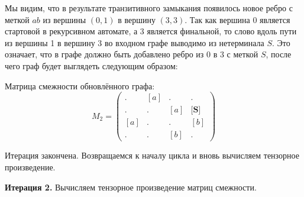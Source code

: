 \begin{example}
Мы видим, что в результате транзитивного замыкания появилось новое ребро с меткой $ab$ из вершины $(0,1)$ в вершину $(3,3)$.
Так как вершина 0 является стартовой в рекурсивном автомате, а 3 является финальной, то слово вдоль пути из вершины 1 в вершину 3 во входном графе выводимо из нетерминала $S$.
Это означает, что в графе должно быть добавлено ребро из $0$ в $3$ с меткой $S$, после чего граф будет выглядеть следующим образом:

\begin{center}
  
\end{center}

Матрица смежности обновлённого графа:
$$ M_2 =
\begin{pmatrix}
. & [a] & . & . \\
. & . & [a] & \textbf{[S]} \\
[a] & . & . & [b] \\
. & . & [b] & .
\end{pmatrix}
$$

Итерация закончена.
Возвращаемся к началу цикла и вновь вычисляем тензорное произведение.

\textbf{Итерация 2.}
Вычисляем тензорное произведение матриц смежности.


\end{example}
